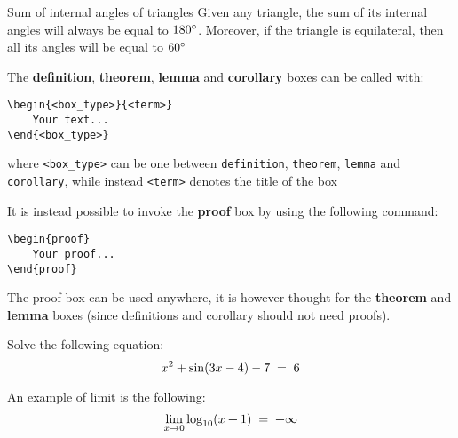 \documentclass[]{notex}
\begin{document}
\begin{corollary}{Sum of internal angles of triangles}
    Given any triangle, the sum of its internal angles will always be equal to $180\degree$. Moreover, if the triangle is equilateral, then all its angles will be equal to $60\degree$
\end{corollary}
\medskip
\noindent The \textbf{definition}, \textbf{theorem}, \textbf{lemma} and \textbf{corollary} boxes can be called with:
\begin{tcolorbox}
    \begin{verbatim}
\begin{<box_type>}{<term>}
    Your text...
\end{<box_type>}\end{verbatim}

\noindent where \verb|<box_type>| can be one between \texttt{definition}, \texttt{theorem}, \texttt{lemma} and \texttt{corollary}, while instead \verb|<term>| denotes the title of the box
\end{tcolorbox}

\noindent It is instead possible to invoke the \textbf{proof} box by using the following command:

\begin{tcolorbox}
    \begin{verbatim}
\begin{proof}
    Your proof...
\end{proof}\end{verbatim}
\end{tcolorbox}

\noindent The proof box can be used anywhere, it is however thought for the \textbf{theorem} and \textbf{lemma} boxes (since definitions and corollary should not need proofs).

\begin{exercise}
    Solve the following equation:
    \[ x^2 + \sin(3x-4) - 7 \; = \; 6 \]
\end{exercise}

\begin{example}
    An example of limit is the following:
    \[ \lim_{x \to 0} \log_{10}(x+1) \; = \; +\infty \]
\end{example}

\end{document}
